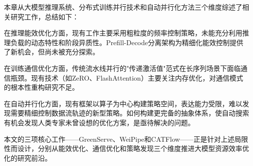 本章从大模型推理系统、分布式训练并行技术和自动并行化方法三个维度综述了相关研究工作，总结如下：

在推理能效优化方面，现有工作主要采用粗粒度的频率控制策略，未能充分利用推理负载的动态特性和阶段异质性。Prefill-Decode分离架构为精细化能效控制提供了新机会，但尚未被充分探索。

在训练通信优化方面，传统流水线并行的"传递激活值"范式在长序列场景下面临通信瓶颈。现有技术（如ZeRO、FlashAttention）主要关注内存优化，对通信模式的根本性重构研究不足。

在自动并行化方面，现有框架以算子为中心构建策略空间，表达能力受限，难以发现需要精细控制数据流轨迹的新型策略。如何构建更完备的抽象体系，使自动搜索有机会发现人类专家未曾设想的优化方案，是亟待解决的问题。

本文的三项核心工作——GreenServe、WeiPipe和CATFlow——正是针对上述局限性而设计，分别从能效优化、通信优化和策略发现三个维度推进大模型资源效率优化的研究前沿。
